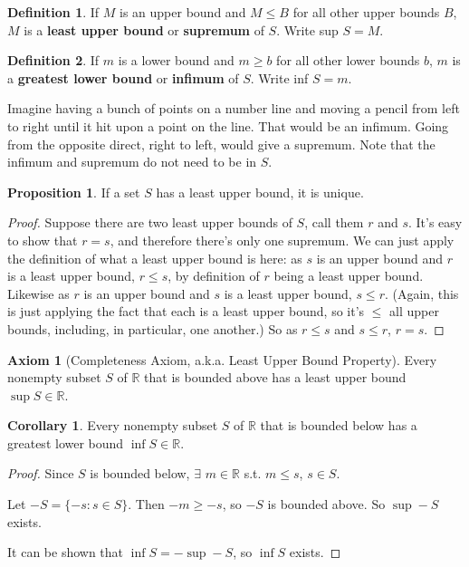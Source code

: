 \documentclass{article}
\theoremstyle{definition}
\newtheorem{definition}{Definition}[section]
\newtheorem{proposition}{Proposition}[section]
\newtheorem{axiom}{Axiom}[section]
\newtheorem{corollary}{Corollary}[section]
\begin{document}
\begin{definition}
If $M$ is an upper bound and $M \leq B$ for all other upper bounds $B$, $M$ is a \textbf{least upper bound} or \textbf{supremum} of $S$. Write sup $S = M$.
\end{definition}

\begin{definition}
If $m$ is a lower bound and $m \geq b$ for all other lower bounds $b$, $m$ is a \textbf{greatest lower bound} or \textbf{infimum} of $S$. Write inf $S = m$.
\end{definition}

Imagine having a bunch of points on a number line and moving a pencil from left to right until it hit upon a point on the line. That would be an infimum. Going from the opposite direct, right to left, would give a supremum. Note that the infimum and supremum do not need to be in $S$.

\begin{proposition}
If a set $S$ has a least upper bound, it is unique.
\end{proposition}

\begin{proof}
Suppose there are two least upper bounds of $S$, call them $r$ and $s$. It's easy to show that $r = s$, and therefore there's only one supremum. We can just apply the definition of what a least upper bound is here: as $s$ is an upper bound and $r$ is a least upper bound, $r \leq s$, by definition of $r$ being a least upper bound. Likewise as $r$ is an upper bound and $s$ is a least upper bound, $s \leq r$. (Again, this is just applying the fact that each is a least upper bound, so it's $\leq$ all upper bounds, including, in particular, one another.) So as $r \leq s$ and $s \leq r$, $r = s$.
\end{proof}

\begin{axiom}[Completeness Axiom, a.k.a. Least Upper Bound Property]
Every nonempty subset $S$ of $\mathbb{R}$ that is bounded above has a least upper bound $\sup S \in\mathbb{R}$.
\end{axiom}

\begin{corollary}
Every nonempty subset $S$ of $\mathbb{R}$ that is bounded below has a greatest lower bound $\inf S \in\mathbb{R}$.
\end{corollary}

\begin{proof}
Since $S$ is bounded below, $\exists$ $m \in \mathbb{R}$ s.t. $m \leq s$, $s \in S$.

Let $-S = \{ -s : s \in S \}$. Then $-m \ge -s$, so $-S$ is bounded above. So $\sup -S$ exists.

It can be shown that $\inf S = - \sup -S$, so $\inf S$ exists.

\end{proof}
\end{document}
